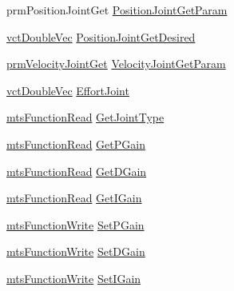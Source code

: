 \begin{DoxyCompactItemize}
\item 
prm\+Position\+Joint\+Get \hyperlink{structmts_p_i_d_qt_widget_1_1_controller_p_i_d_struct_aaed49b26735d2f1c14203feb4c3e3035}{Position\+Joint\+Get\+Param}
\item 
\hyperlink{vct_dynamic_vector_types_8h_ade4b3068c86fb88f41af2e5187e491c2}{vct\+Double\+Vec} \hyperlink{structmts_p_i_d_qt_widget_1_1_controller_p_i_d_struct_aa1c17a8bd709539648087c15051df449}{Position\+Joint\+Get\+Desired}
\item 
\hyperlink{classprm_velocity_joint_get}{prm\+Velocity\+Joint\+Get} \hyperlink{structmts_p_i_d_qt_widget_1_1_controller_p_i_d_struct_a752b3f63f74d847587a28ecb6d451f4f}{Velocity\+Joint\+Get\+Param}
\item 
\hyperlink{vct_dynamic_vector_types_8h_ade4b3068c86fb88f41af2e5187e491c2}{vct\+Double\+Vec} \hyperlink{structmts_p_i_d_qt_widget_1_1_controller_p_i_d_struct_aeaf828e375da93ba720f086ada488872}{Effort\+Joint}
\item 
\hyperlink{classmts_function_read}{mts\+Function\+Read} \hyperlink{structmts_p_i_d_qt_widget_1_1_controller_p_i_d_struct_abd4222d930a2f14d9ad8c7134e0674cd}{Get\+Joint\+Type}
\item 
\hyperlink{classmts_function_read}{mts\+Function\+Read} \hyperlink{structmts_p_i_d_qt_widget_1_1_controller_p_i_d_struct_a68db81247f8178e5435ccb691bb57ec2}{Get\+P\+Gain}
\item 
\hyperlink{classmts_function_read}{mts\+Function\+Read} \hyperlink{structmts_p_i_d_qt_widget_1_1_controller_p_i_d_struct_a6df0ee7568c23319914fbc0b8cecdbfb}{Get\+D\+Gain}
\item 
\hyperlink{classmts_function_read}{mts\+Function\+Read} \hyperlink{structmts_p_i_d_qt_widget_1_1_controller_p_i_d_struct_aa737b5930269ff3452acb563c1a743f1}{Get\+I\+Gain}
\item 
\hyperlink{classmts_function_write}{mts\+Function\+Write} \hyperlink{structmts_p_i_d_qt_widget_1_1_controller_p_i_d_struct_a14411a7decab1058d1b267b997a2960f}{Set\+P\+Gain}
\item 
\hyperlink{classmts_function_write}{mts\+Function\+Write} \hyperlink{structmts_p_i_d_qt_widget_1_1_controller_p_i_d_struct_a9abb10038fcad81ddfa684b60833ab0f}{Set\+D\+Gain}
\item 
\hyperlink{classmts_function_write}{mts\+Function\+Write} \hyperlink{structmts_p_i_d_qt_widget_1_1_controller_p_i_d_struct_a2b46f76b59bc5f723b4e10b8533a3321}{Set\+I\+Gain}
\end{DoxyCompactItemize}


